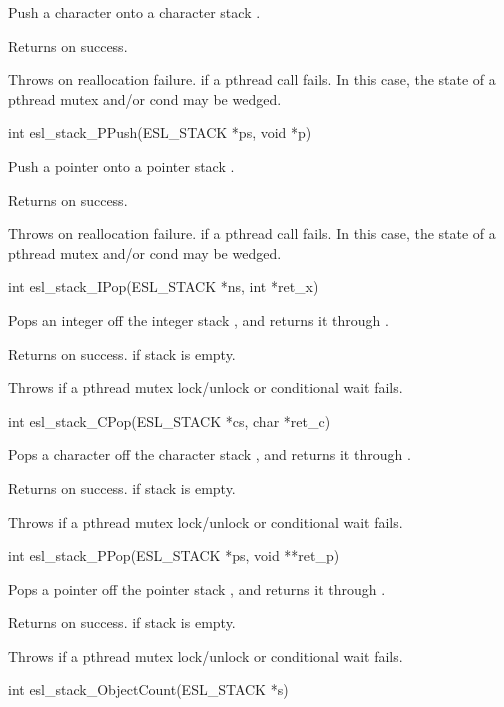 \begin{sreapi}
Push a character  onto a character stack .

Returns  on success.

Throws  on reallocation failure.
 if a pthread call fails. In this case, the
state of a pthread mutex and/or cond may be wedged.             


\hypertarget{func:esl_stack_PPush()}
{\item[int esl\_stack\_PPush(ESL\_STACK *ps, void *p)]}

Push a pointer  onto a pointer stack .

Returns  on success.

Throws  on reallocation failure.
 if a pthread call fails. In this case, the
state of a pthread mutex and/or cond may be wedged.             


\hypertarget{func:esl_stack_IPop()}
{\item[int esl\_stack\_IPop(ESL\_STACK *ns, int *ret\_x)]}

Pops an integer off the integer stack , and returns
it through .

Returns  on success.
 if stack is empty.

Throws  if a pthread mutex lock/unlock or conditional wait fails.


\hypertarget{func:esl_stack_CPop()}
{\item[int esl\_stack\_CPop(ESL\_STACK *cs, char *ret\_c)]}

Pops a character off the character stack , and returns
it through .

Returns  on success. 
 if stack is empty.

Throws  if a pthread mutex lock/unlock or conditional wait fails.


\hypertarget{func:esl_stack_PPop()}
{\item[int esl\_stack\_PPop(ESL\_STACK *ps, void **ret\_p)]}

Pops a pointer off the pointer stack , and returns
it through .

Returns  on success. 
 if stack is empty.

Throws  if a pthread mutex lock/unlock or conditional wait fails.


\hypertarget{func:esl_stack_ObjectCount()}
{\item[int esl\_stack\_ObjectCount(ESL\_STACK *s)]}


\end{sreapi}

